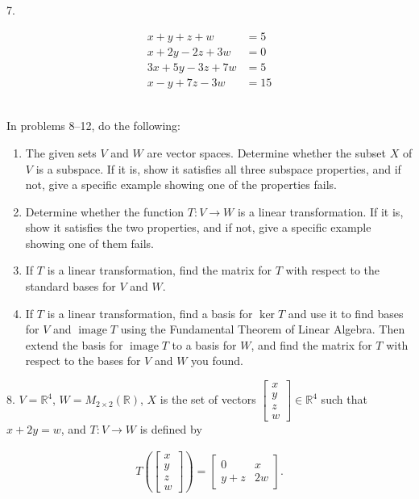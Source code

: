 \documentclass{article}
\begin{document}
7.

\begin{align*}
	x + y + z + w &= 5\\
	x + 2y - 2z + 3w &= 0\\
	3x + 5y - 3z + 7w &= 5\\
	x - y + 7z - 3w &= 15
\end{align*}

~\\

In problems 8--12, do the following:

\begin{enumerate}

	\item The given sets $V$ and $W$ are vector spaces. Determine whether the subset $X$ of $V$ is a subspace. If it is, show it satisfies all three subspace properties, and if not, give a specific example showing one of the properties fails.

	\item Determine whether the function $T : V \to W$ is a linear transformation. If it is, show it satisfies the two properties, and if not, give a specific example showing one of them fails.

	\item If $T$ is a linear transformation, find the matrix for $T$ with respect to the standard bases for $V$ and $W$.

	\item If $T$ is a linear transformation, find a basis for $\ker T$ and use it to find bases for $V$ and $\operatorname{image} T$ using the Fundamental Theorem of Linear Algebra. Then extend the basis for $\operatorname{image} T$ to a basis for $W$, and find the matrix for $T$ with respect to the bases for $V$ and $W$ you found.

\end{enumerate}

8. $V = \mathbb{R}^4$, $W = M_{2 \times 2}(\mathbb{R})$, $X$ is the set of vectors $\left[\begin{array}{c} x \\ y \\ z \\ w \end{array}\right] \in \mathbb{R}^4$ such that $x + 2y = w$, and $T : V \to W$ is defined by

\begin{align*}
	T\left( \left[\begin{array}{c} x \\ y \\ z \\ w \end{array}\right] \right) = \left[\begin{array}{cc} 0& x \\ y + z& 2w \end{array}\right].
\end{align*}
\end{document}
